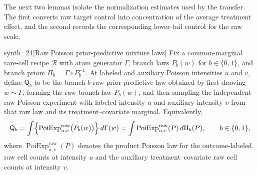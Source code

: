 The next two lemmas isolate the normalization estimates used by the transfer. The first converts raw target control into concentration of the average treatment effect, and the second records the corresponding lower-tail control for the raw scale.

\begin{definitionv}{synth_21}[Raw Poisson prior-predictive mixture laws]
Fix a common-marginal rare-cell recipe \(\mathcal R\) with atom generator \(\Gamma\), branch laws \(P_b(w)\) for \(b\in\{0,1\}\), and branch priors \(\Pi_b=\Gamma\circ P_b^{-1}\). At labeled and auxiliary Poisson intensities \(u\) and \(v\), define \(\mathsf Q_b\) to be the branch-\(b\) raw prior-predictive law obtained by first drawing \(w\sim\Gamma\), forming the raw branch law \(P_b(w)\), and then sampling the independent raw Poisson experiment with labeled intensity \(u\) and auxiliary intensity \(v\) from that raw law and its treatment--covariate marginal. Equivalently,
\[
\mathsf Q_b
=
\int
\Bigl\{
\operatorname{PoiExp}_{u,v}^{\mathrm{raw}}\bigl(P_b(w)\bigr)
\Bigr\}\,d\Gamma(w)
=
\int
\operatorname{PoiExp}_{u,v}^{\mathrm{raw}}(P)\,d\Pi_b(P),
\qquad b\in\{0,1\},
\]
where \(\operatorname{PoiExp}_{u,v}^{\mathrm{raw}}(P)\) denotes the product Poisson law for the outcome-labeled raw cell counts at intensity \(u\) and the auxiliary treatment--covariate raw cell counts at intensity \(v\).
\end{definitionv}

